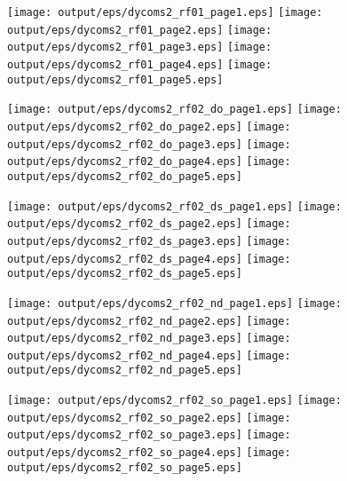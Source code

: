 \documentclass[11pt]{article}
\begin{document}
\begin{center}

\texttt{[image: output/eps/dycoms2\_rf01\_page1.eps]}
\texttt{[image: output/eps/dycoms2\_rf01\_page2.eps]}
\texttt{[image: output/eps/dycoms2\_rf01\_page3.eps]}
\texttt{[image: output/eps/dycoms2\_rf01\_page4.eps]}
\texttt{[image: output/eps/dycoms2\_rf01\_page5.eps]}
\end{center}
\newpage

\begin{center}

\texttt{[image: output/eps/dycoms2\_rf02\_do\_page1.eps]}
\texttt{[image: output/eps/dycoms2\_rf02\_do\_page2.eps]}
\texttt{[image: output/eps/dycoms2\_rf02\_do\_page3.eps]}
\texttt{[image: output/eps/dycoms2\_rf02\_do\_page4.eps]}
\texttt{[image: output/eps/dycoms2\_rf02\_do\_page5.eps]}
\end{center}
\newpage

\begin{center}

\texttt{[image: output/eps/dycoms2\_rf02\_ds\_page1.eps]}
\texttt{[image: output/eps/dycoms2\_rf02\_ds\_page2.eps]}
\texttt{[image: output/eps/dycoms2\_rf02\_ds\_page3.eps]}
\texttt{[image: output/eps/dycoms2\_rf02\_ds\_page4.eps]}
\texttt{[image: output/eps/dycoms2\_rf02\_ds\_page5.eps]}
\end{center}
\newpage

\begin{center}

\texttt{[image: output/eps/dycoms2\_rf02\_nd\_page1.eps]}
\texttt{[image: output/eps/dycoms2\_rf02\_nd\_page2.eps]}
\texttt{[image: output/eps/dycoms2\_rf02\_nd\_page3.eps]}
\texttt{[image: output/eps/dycoms2\_rf02\_nd\_page4.eps]}
\texttt{[image: output/eps/dycoms2\_rf02\_nd\_page5.eps]}
\end{center}
\newpage

\begin{center}

\texttt{[image: output/eps/dycoms2\_rf02\_so\_page1.eps]}
\texttt{[image: output/eps/dycoms2\_rf02\_so\_page2.eps]}
\texttt{[image: output/eps/dycoms2\_rf02\_so\_page3.eps]}
\texttt{[image: output/eps/dycoms2\_rf02\_so\_page4.eps]}
\texttt{[image: output/eps/dycoms2\_rf02\_so\_page5.eps]}
\end{center}
\newpage
\end{document}
